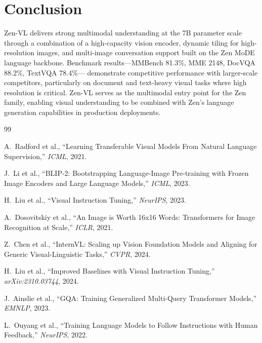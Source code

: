 \documentclass[11pt,a4paper]{article}
\begin{document}
\section{Conclusion}

Zen-VL delivers strong multimodal understanding at the 7B parameter scale through a
combination of a high-capacity vision encoder, dynamic tiling for high-resolution images,
and multi-image conversation support built on the Zen MoDE language backbone.
Benchmark results---MMBench 81.3\%, MME 2148, DocVQA 88.2\%, TextVQA 78.4\%---
demonstrate competitive performance with larger-scale competitors, particularly on
document and text-heavy visual tasks where high resolution is critical. Zen-VL serves
as the multimodal entry point for the Zen family, enabling visual understanding to be
combined with Zen's language generation capabilities in production deployments.

\begin{thebibliography}{99}

A.~Radford et al., ``Learning Transferable Visual Models From Natural Language Supervision,''
\textit{ICML}, 2021.

J.~Li et al., ``BLIP-2: Bootstrapping Language-Image Pre-training with Frozen Image Encoders
and Large Language Models,'' \textit{ICML}, 2023.

H.~Liu et al., ``Visual Instruction Tuning,'' \textit{NeurIPS}, 2023.

A.~Dosovitskiy et al., ``An Image is Worth 16x16 Words: Transformers for Image Recognition
at Scale,'' \textit{ICLR}, 2021.

Z.~Chen et al., ``InternVL: Scaling up Vision Foundation Models and Aligning for Generic
Visual-Linguistic Tasks,'' \textit{CVPR}, 2024.

H.~Liu et al., ``Improved Baselines with Visual Instruction Tuning,''
\textit{arXiv:2310.03744}, 2024.

J.~Ainslie et al., ``GQA: Training Generalized Multi-Query Transformer Models,''
\textit{EMNLP}, 2023.

L.~Ouyang et al., ``Training Language Models to Follow Instructions with Human Feedback,''
\textit{NeurIPS}, 2022.

\end{thebibliography}
\end{document}
